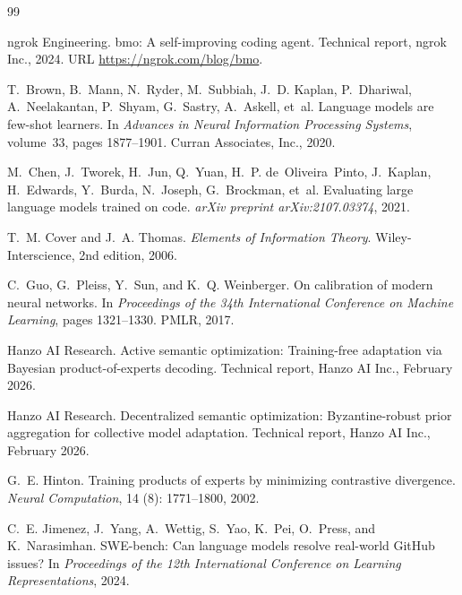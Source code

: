 \documentclass[11pt]{article}
\begin{document}

\begin{thebibliography}{99}

ngrok Engineering.
\newblock bmo: A self-improving coding agent.
\newblock Technical report, ngrok Inc., 2024.
\newblock URL \url{https://ngrok.com/blog/bmo}.

T.~Brown, B.~Mann, N.~Ryder, M.~Subbiah, J.~D. Kaplan, P.~Dhariwal,
  A.~Neelakantan, P.~Shyam, G.~Sastry, A.~Askell, et~al.
\newblock Language models are few-shot learners.
\newblock In \emph{Advances in Neural Information Processing Systems},
  volume~33, pages 1877--1901. Curran Associates, Inc., 2020.

M.~Chen, J.~Tworek, H.~Jun, Q.~Yuan, H.~P. de~Oliveira~Pinto, J.~Kaplan,
  H.~Edwards, Y.~Burda, N.~Joseph, G.~Brockman, et~al.
\newblock Evaluating large language models trained on code.
\newblock \emph{arXiv preprint arXiv:2107.03374}, 2021.

T.~M. Cover and J.~A. Thomas.
\newblock \emph{Elements of Information Theory}.
\newblock Wiley-Interscience, 2nd edition, 2006.

C.~Guo, G.~Pleiss, Y.~Sun, and K.~Q. Weinberger.
\newblock On calibration of modern neural networks.
\newblock In \emph{Proceedings of the 34th International Conference on Machine
  Learning}, pages 1321--1330. PMLR, 2017.

Hanzo AI Research.
\newblock Active semantic optimization: Training-free adaptation via Bayesian
  product-of-experts decoding.
\newblock Technical report, Hanzo AI Inc., February 2026.

Hanzo AI Research.
\newblock Decentralized semantic optimization: Byzantine-robust prior
  aggregation for collective model adaptation.
\newblock Technical report, Hanzo AI Inc., February 2026.

G.~E. Hinton.
\newblock Training products of experts by minimizing contrastive divergence.
\newblock \emph{Neural Computation}, 14 (8): 1771--1800,
  2002.

C.~E. Jimenez, J.~Yang, A.~Wettig, S.~Yao, K.~Pei, O.~Press, and K.~Narasimhan.
\newblock SWE-bench: Can language models resolve real-world GitHub issues?
\newblock In \emph{Proceedings of the 12th International Conference on Learning
  Representations}, 2024.


\end{thebibliography}
\end{document}
